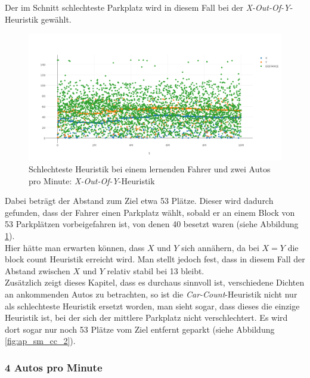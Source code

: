 Der im Schnitt schlechteste Parkplatz wird in diesem Fall bei der  \emph{X-Out-Of-Y}-Heuristik gewählt. \\
\begin{figure}
	\includegraphics[width=\textwidth]{analyse/SingleMutant/xy2.png}
	\caption{Schlechteste Heuristik bei einem lernenden Fahrer und zwei Autos pro Minute: \emph{X-Out-Of-Y}-Heuristik}\label{fig:res_sm_2pm_worst}
\end{figure}
Dabei beträgt der Abstand zum Ziel etwa 53 Plätze. Dieser wird dadurch gefunden, dass der Fahrer einen Parkplatz wählt, sobald er an einem Block von 53 Parkplätzen vorbeigefahren ist, von denen 40 besetzt waren (siehe Abbildung \ref{fig:res_sm_2pm_worst}).\\
Hier hätte man erwarten können, dass $X$ und $Y$ sich annähern, da bei $X=Y$ die block count Heuristik erreicht wird. Man stellt jedoch fest, dass in diesem Fall der Abstand zwischen $X$ und $Y$ relativ stabil bei 13 bleibt.\\
Zusätzlich zeigt dieses Kapitel, dass es durchaus sinnvoll ist, verschiedene Dichten an ankommenden Autos zu betrachten, so ist die \emph{Car-Count}-Heuristik nicht nur als schlechteste Heuristik ersetzt worden, man sieht sogar, dass dieses die einzige Heuristik ist, bei der sich der mittlere Parkplatz nicht verschlechtert. Es wird dort sogar nur noch 53 Plätze vom Ziel entfernt geparkt (siehe Abbildung \ref{fig:ap_sm_cc_2}).

\subsubsection{4 Autos pro Minute} 

